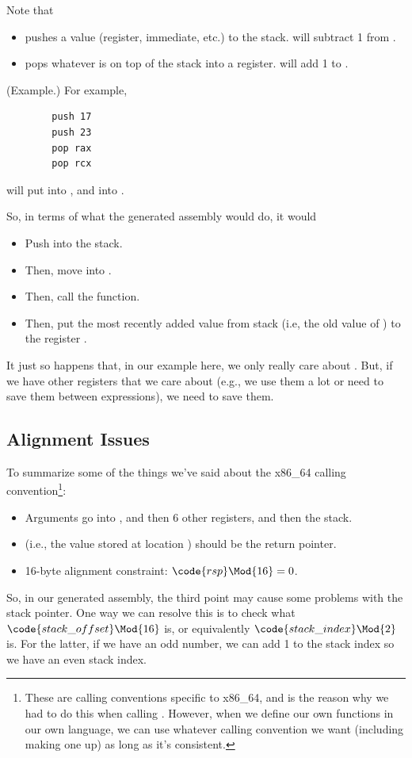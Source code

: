 \documentclass[letterpaper]{article}
\begin{document}
\bigskip 

Note that 
\begin{itemize}
    \item {} pushes a value (register, immediate, etc.) to the stack.  will subtract 1 from . 
    \item {} pops whatever is on top of the stack into a register.  will add 1 to . 
\end{itemize}
\begin{mdframed}[nobreak=true]
    (Example.) For example, 
    \begin{verbatim}
        push 17 
        push 23 
        pop rax 
        pop rcx \end{verbatim}
    will put  into , and  into .
\end{mdframed}
So, in terms of what the generated assembly would do, it would 
\begin{itemize}
    \item Push  into the stack. 
    \item Then, move  into .
    \item Then, call the  function. 
    \item Then, put the most recently added value from stack (i.e, the old value of ) to the register .
\end{itemize}
It just so happens that, in our example here, we only really care about . But, if we have other registers that we care about (e.g., we use them a lot or need to save them between expressions), we need to save them. 

\subsection{Alignment Issues}
To summarize some of the things we've said about the x86\_64 calling convention\footnote{These are calling conventions specific to x86\_64, and is the reason why we had to do this when calling . However, when we define our own functions in our own language, we can use whatever calling convention we want (including making one up) as long as it's consistent. }:
\begin{itemize}
    \item Arguments go into , and then 6 other registers, and then the stack.
    \item \code{[rsp]} (i.e., the value stored at location ) should be the return pointer.
    \item 16-byte alignment constraint: $\code{rsp} \Mod{16} = 0$.
\end{itemize}
So, in our generated assembly, the third point may cause some problems with the stack pointer. One way we can resolve this is to check what $\code{stack\_offset} \Mod{16}$ is, or equivalently $\code{stack\_index} \Mod{2}$ is. For the latter, if we have an odd number, we can add 1 to the stack index so we have an even stack index.

\end{document}
